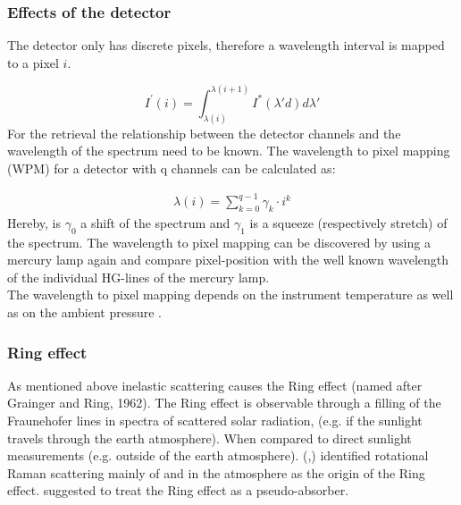 \documentclass  [
  paper    = a4,
  BCOR     = 10mm,
  twoside,
  fontsize = 12pt,
  fleqn,
  toc      = bibnumbered,
  toc      = listofnumbered,
  numbers  = noendperiod,
  headings = normal,
  listof   = leveldown,
  version  = 3.03
]                                       {scrreprt}
\begin{document}
	\subsubsection*{Effects of the detector}
	The detector only has discrete pixels, therefore a wavelength interval is mapped to a pixel $i$.
	
	\begin{equation}
	I^{'}\left(i\right) = \int_{\lambda(i)}^{\lambda(i+1)}I^{*}\left(\lambda{'}d\right)d\lambda{'}
	\end{equation}
	For the retrieval the relationship between the detector channels and the wavelength of the spectrum need to be known.
	The wavelength to pixel mapping (WPM) for a detector with q channels can be calculated as:

	\begin{eqnarray}
	\lambda(i) = \sum_{k=0}^{q-1}\gamma_{k}\cdot i^{k}
	\end{eqnarray}
	Hereby, is $\gamma_{0}$ a shift of the spectrum and $\gamma_{1}$ is a squeeze (respectively stretch) of the spectrum.
	The wavelength to pixel mapping can be discovered by using a mercury lamp again and compare pixel-position with the well known wavelength of the individual HG-lines of the mercury lamp.\\
	The wavelength to pixel mapping depends on the instrument temperature as well as on the ambient pressure \citep{lubcke2014bro}.
	\subsubsection*{Ring effect}
	As mentioned above inelastic scattering causes the Ring effect (named after Grainger and Ring, 1962).
	The Ring effect is observable through a filling of the Fraunehofer lines in spectra of scattered solar radiation, (e.g. if the sunlight travels through the earth atmosphere). When compared to direct sunlight measurements (e.g. outside of the earth atmosphere).
	(\citet{bussemer1993ring},\citet{solomon1987interpretation}) identified rotational Raman scattering mainly of
	 and  in the atmosphere as the origin of the Ring effect.
	\citet{solomon1987interpretation} suggested to treat the Ring effect as a pseudo-absorber. 

\end{document}

